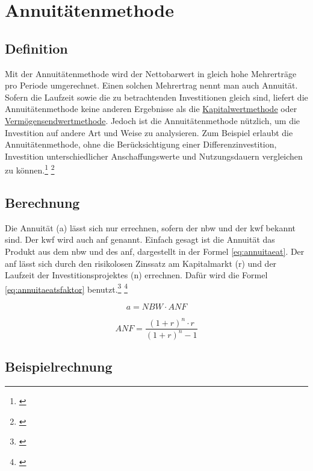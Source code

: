 \chapter{Annuitätenmethode}
\label{Annuitaetenmethode}

\section{Definition}


Mit der Annuitätenmethode wird der Nettobarwert in gleich hohe Mehrerträge pro Periode umgerechnet. Einen solchen Mehrertrag nennt man auch Annuität. Sofern die Laufzeit sowie die zu betrachtenden Investitionen gleich sind, liefert die Annuitätenmethode keine anderen Ergebnisse als die \hyperref[Kapitalwertmethode]{Kapitalwertmethode} oder \hyperref[Vermoegensendwertmethode]{Vermögensendwertmethode}. Jedoch ist die Annuitätenmethode nützlich, um die Investition auf andere Art und Weise zu analysieren. Zum Beispiel erlaubt die Annuitätenmethode, ohne die Berücksichtigung einer Differenzinvestition, Investition unterschiedlicher Anschaffungswerte und Nutzungsdauern vergleichen zu können.\footnote{\cite{bwllexicon-annu}} \footnote{\cite{wikipedia-annu}}


\section{Berechnung}

Die Annuität (a) lässt sich nur errechnen, sofern der \ac{nbw} und der \linebreak \ac{kwf} bekannt sind. Der \ac{kwf} wird auch \ac{anf} genannt. Einfach gesagt ist die Annuität das Produkt aus dem \ac{nbw} und des \ac{anf}, dargestellt in der Formel \eqref{eq:annuitaeat}. Der \ac{anf} lässt sich durch den risikolosen Zinssatz am Kapitalmarkt (r) und der Laufzeit der Investitionsprojektes (n) errechnen. Dafür wird die Formel \eqref{eq:annuitaeatsfaktor} benutzt.\footnote{\cite{studyflix-annu}} \footnote{\cite{bwllexicon-annu}}

\begin{equation}
    a = NBW \cdot ANF
    \label{eq:annuitaeat}
\end{equation}

\begin{equation}
    ANF = \frac{ (1 + r)^n \cdot r }{ (1 + r)^n - 1 }
    \label{eq:annuitaeatsfaktor}
\end{equation}

\section{Beispielrechnung}

